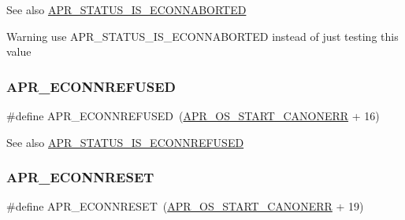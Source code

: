 \begin{DoxySeeAlso}{See also}
\mbox{\hyperlink{group___a_p_r___s_t_a_t_u_s___i_s_ga528a8032b13c75fbdeb9bf7e4c0be493}{A\+P\+R\+\_\+\+S\+T\+A\+T\+U\+S\+\_\+\+I\+S\+\_\+\+E\+C\+O\+N\+N\+A\+B\+O\+R\+T\+ED}} 
\end{DoxySeeAlso}
\begin{DoxyWarning}{Warning}
use A\+P\+R\+\_\+\+S\+T\+A\+T\+U\+S\+\_\+\+I\+S\+\_\+\+E\+C\+O\+N\+N\+A\+B\+O\+R\+T\+ED instead of just testing this value 
\end{DoxyWarning}
\mbox{\label{group___a_p_r___error_ga1b4d1d847bebdfc48af343bc2486ecb8}} 
\subsubsection{\texorpdfstring{A\+P\+R\+\_\+\+E\+C\+O\+N\+N\+R\+E\+F\+U\+S\+ED}{APR\_ECONNREFUSED}}
{\footnotesize\ttfamily \#define A\+P\+R\+\_\+\+E\+C\+O\+N\+N\+R\+E\+F\+U\+S\+ED~(\mbox{\hyperlink{group__apr__errno_ga7bca957c11b80b31cb54b0d2cbe9e025}{A\+P\+R\+\_\+\+O\+S\+\_\+\+S\+T\+A\+R\+T\+\_\+\+C\+A\+N\+O\+N\+E\+RR}} + 16)}

\begin{DoxySeeAlso}{See also}
\mbox{\hyperlink{group___a_p_r___s_t_a_t_u_s___i_s_ga4decf55c5cea9660a44fed0c74265ee6}{A\+P\+R\+\_\+\+S\+T\+A\+T\+U\+S\+\_\+\+I\+S\+\_\+\+E\+C\+O\+N\+N\+R\+E\+F\+U\+S\+ED}} 
\end{DoxySeeAlso}
\mbox{\label{group___a_p_r___error_ga264bfe2056e917728e9ed060b58869c2}} 
\subsubsection{\texorpdfstring{A\+P\+R\+\_\+\+E\+C\+O\+N\+N\+R\+E\+S\+ET}{APR\_ECONNRESET}}
{\footnotesize\ttfamily \#define A\+P\+R\+\_\+\+E\+C\+O\+N\+N\+R\+E\+S\+ET~(\mbox{\hyperlink{group__apr__errno_ga7bca957c11b80b31cb54b0d2cbe9e025}{A\+P\+R\+\_\+\+O\+S\+\_\+\+S\+T\+A\+R\+T\+\_\+\+C\+A\+N\+O\+N\+E\+RR}} + 19)}

